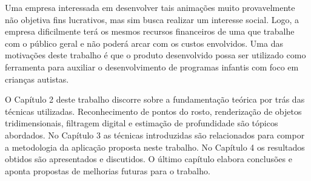 Uma empresa interessada em desenvolver tais animações muito provavelmente não
objetiva fins lucrativos, mas sim busca realizar um interesse social. Logo, a
empresa dificilmente terá os mesmos recursos financeiros de uma que trabalhe com
o público geral e não poderá arcar com os custos envolvidos.  Uma das motivações
deste trabalho é que o produto desenvolvido possa ser utilizado como ferramenta
para auxiliar o desenvolvimento de programas infantis com foco em crianças
autistas.

O Capítulo 2 deste trabalho discorre sobre a fundamentação teórica por trás das
técnicas utilizadas. Reconhecimento de pontos do rosto, renderização de objetos
tridimensionais, filtragem digital e estimação de profundidade são tópicos
abordados. No Capítulo 3 as técnicas introduzidas são relacionados para compor a
metodologia da aplicação proposta neste trabalho.  No Capítulo 4 os resultados
obtidos são apresentados e discutidos.  O último capítulo elabora conclusões e
aponta propostas de melhorias futuras para o trabalho.
